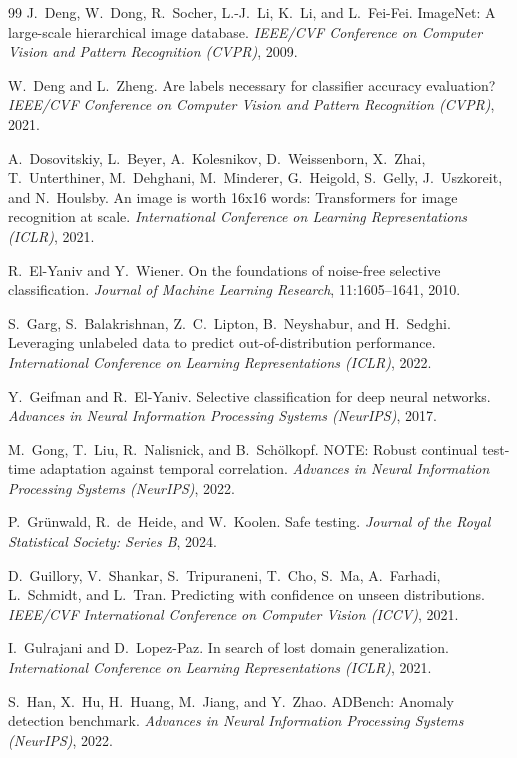 \begin{thebibliography}{99}
J.~Deng, W.~Dong, R.~Socher, L.-J.~Li, K.~Li, and L.~Fei-Fei.
ImageNet: A large-scale hierarchical image database.
\textit{IEEE/CVF Conference on Computer Vision and Pattern Recognition (CVPR)}, 2009.

W.~Deng and L.~Zheng.
Are labels necessary for classifier accuracy evaluation?
\textit{IEEE/CVF Conference on Computer Vision and Pattern Recognition (CVPR)}, 2021.

A.~Dosovitskiy, L.~Beyer, A.~Kolesnikov, D.~Weissenborn, X.~Zhai,
T.~Unterthiner, M.~Dehghani, M.~Minderer, G.~Heigold, S.~Gelly,
J.~Uszkoreit, and N.~Houlsby.
An image is worth 16x16 words: Transformers for image recognition at scale.
\textit{International Conference on Learning Representations (ICLR)}, 2021.

R.~El-Yaniv and Y.~Wiener.
On the foundations of noise-free selective classification.
\textit{Journal of Machine Learning Research}, 11:1605--1641, 2010.

S.~Garg, S.~Balakrishnan, Z.~C.~Lipton, B.~Neyshabur, and H.~Sedghi.
Leveraging unlabeled data to predict out-of-distribution performance.
\textit{International Conference on Learning Representations (ICLR)}, 2022.

Y.~Geifman and R.~El-Yaniv.
Selective classification for deep neural networks.
\textit{Advances in Neural Information Processing Systems (NeurIPS)}, 2017.

M.~Gong, T.~Liu, R.~Nalisnick, and B.~Sch\"olkopf.
NOTE: Robust continual test-time adaptation against temporal correlation.
\textit{Advances in Neural Information Processing Systems (NeurIPS)}, 2022.

P.~Gr\"unwald, R.~de~Heide, and W.~Koolen.
Safe testing.
\textit{Journal of the Royal Statistical Society: Series B}, 2024.

D.~Guillory, V.~Shankar, S.~Tripuraneni, T.~Cho, S.~Ma, A.~Farhadi,
L.~Schmidt, and L.~Tran.
Predicting with confidence on unseen distributions.
\textit{IEEE/CVF International Conference on Computer Vision (ICCV)}, 2021.

I.~Gulrajani and D.~Lopez-Paz.
In search of lost domain generalization.
\textit{International Conference on Learning Representations (ICLR)}, 2021.

S.~Han, X.~Hu, H.~Huang, M.~Jiang, and Y.~Zhao.
ADBench: Anomaly detection benchmark.
\textit{Advances in Neural Information Processing Systems (NeurIPS)}, 2022.


\end{thebibliography}
